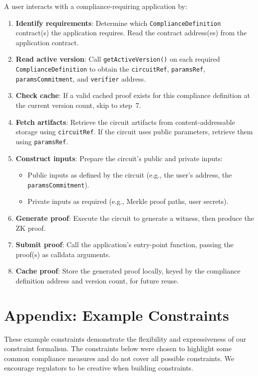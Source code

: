 \documentclass[9pt]{extreport}
\begin{document}
A user interacts with a compliance-requiring application by:

\begin{enumerate}
    \item \textbf{Identify requirements}: Determine which \texttt{ComplianceDefinition} contract(s) the application requires. Read the contract address(es) from the application contract.
    \item \textbf{Read active version}: Call \texttt{getActiveVersion()} on each required \texttt{ComplianceDefinition} to obtain the \texttt{circuitRef}, \texttt{paramsRef}, \texttt{paramsCommitment}, and \texttt{verifier} address.
    \item \textbf{Check cache}: If a valid cached proof exists for this compliance definition at the current version count, skip to step~7.
    \item \textbf{Fetch artifacts}: Retrieve the circuit artifacts from content-addressable storage using \texttt{circuitRef}. If the circuit uses public parameters, retrieve them using \texttt{paramsRef}.
    \item \textbf{Construct inputs}: Prepare the circuit's public and private inputs:
    \begin{itemize}
        \item Public inputs as defined by the circuit (e.g., the user's address, the \texttt{paramsCommitment}).
        \item Private inputs as required (e.g., Merkle proof paths, user secrets).
    \end{itemize}
    \item \textbf{Generate proof}: Execute the circuit to generate a witness, then produce the ZK proof.
    \item \textbf{Submit proof}: Call the application's entry-point function, passing the proof(s) as calldata arguments.
    \item \textbf{Cache proof}: Store the generated proof locally, keyed by the compliance definition address and version count, for future reuse.
\end{enumerate}

\chapter{Appendix: Example Constraints}
\label{sec:prototype-constraints}
These example constraints demonstrate the flexibility and expressiveness of our constraint formalism.  The constraints below were chosen to highlight some common compliance measures and do not cover all possible constraints.  We encourage regulators to be creative when building constraints.
\end{document}
